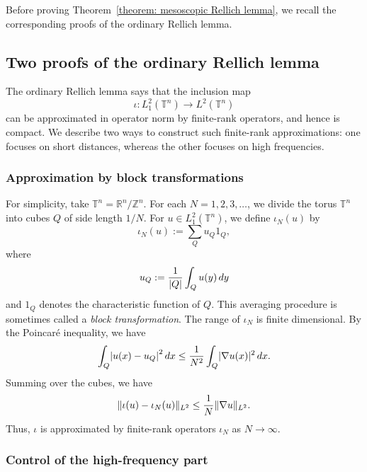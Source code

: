 \documentclass[a4paper,oneside,12pt]{amsart}
\theoremstyle{plain}
\theoremstyle{definition}
\theoremstyle{remark}
\newcommand{\Z}{\mathbb{Z}}
\newcommand{\R}{\mathbb{R}}
\DeclarePairedDelimiter{\abs}{\lvert}{\rvert}
\DeclarePairedDelimiter{\norm}{\lVert}{\rVert}
\newcommand{\flattorus}{\mathbb{T}^n}
\newcommand{\Ltwonorm}[2][L^2]{\norm{#2}_{#1}}
\begin{document}
Before proving Theorem~\ref{theorem: mesoscopic Rellich lemma}, we recall the corresponding proofs of the ordinary Rellich lemma.

\subsection{Two proofs of the ordinary Rellich lemma}

The ordinary Rellich lemma says that the inclusion map
\begin{equation}
  \iota \colon L^2_1(\flattorus) \to L^2(\flattorus)
\end{equation}
can be approximated in operator norm by finite-rank operators, and hence is compact.
We describe two ways to construct such finite-rank approximations:
one focuses on short distances, whereas the other focuses
on high frequencies.

\subsubsection{Approximation by block transformations}

For simplicity, take $\flattorus=\R^n/\Z^n$.
For each $N = 1,2,3,\dots$, we divide the torus $\flattorus$ into cubes $Q$ of side length $1/N$.
For $u \in L^2_1(\flattorus)$, we define $\iota_N(u)$ by
\begin{equation}
  \iota_N(u) := \sum_Q u_Q 1_Q,
\end{equation}
where
\begin{equation}
  u_Q := \frac{1}{\abs{Q}} \int_Q u(y) \,dy
\end{equation}
and $1_Q$ denotes the characteristic function of $Q$.
This averaging procedure is sometimes called a \emph{block transformation}.
The range of $\iota_N$ is finite dimensional.
By the Poincar\'e inequality, we have
\begin{equation}
  \int_Q \abs*{u(x) - u_Q}^2 \,dx \le \frac{1}{N^2} \int_Q \abs{\nabla u(x)}^2 \,dx.
\end{equation}
Summing over the cubes, we have
\begin{equation}
  \Ltwonorm{\iota(u) - \iota_N(u)} \le \frac{1}{N} \Ltwonorm{\nabla u}.
\end{equation}
Thus, $\iota$ is approximated by finite-rank operators $\iota_N$ as $N \to \infty$.

\subsubsection{Control of the high-frequency part}
\end{document}
